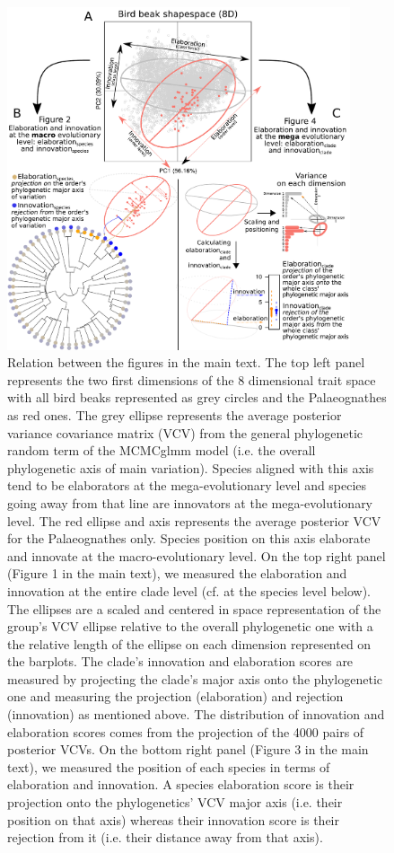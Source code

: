 \documentclass[12pt,letterpaper]{article}
\begin{document}
\begin{figure}[!htbp]
\centering
   \includegraphics[width=0.9\textwidth]{Figures/cheat_sheet.pdf}
\caption{\scriptsize Relation between the figures in the main text.
The top left panel represents the two first dimensions of the 8 dimensional trait space with all bird beaks represented as grey circles and the Palaeognathes as red ones.
The grey ellipse represents the average posterior variance covariance matrix (VCV) from the general phylogenetic random term of the MCMCglmm model (i.e. the overall phylogenetic axis of main variation).
Species aligned with this axis tend to be elaborators at the mega-evolutionary level and species going away from that line are innovators at the mega-evolutionary level.
The red ellipse and axis represents the average posterior VCV for the Palaeognathes only.
Species position on this axis elaborate and innovate at the macro-evolutionary level.
On the top right panel (Figure 1 in the main text), we measured the elaboration and innovation at the entire clade level (cf. at the species level below).
The ellipses are a scaled and centered in space representation of the group’s VCV ellipse relative to the overall phylogenetic one with a the relative length of the ellipse on each dimension represented on the barplots.
The clade's innovation and elaboration scores are measured by projecting the clade's major axis onto the phylogenetic one and measuring the projection (elaboration) and rejection (innovation) as mentioned above.
The distribution of innovation and elaboration scores comes from the projection of the 4000 pairs of posterior VCVs.
On the bottom right panel (Figure 3 in the main text), we measured the position of each species in terms of elaboration and innovation.
A species elaboration score is their projection onto the phylogenetics' VCV major axis (i.e. their position on that axis) whereas their innovation score is their rejection from it (i.e. their distance away from that axis).}
\label{Fig:cheat_sheet}
\end{figure}
\end{document}
